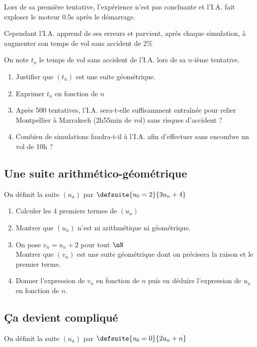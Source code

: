 \documentclass[oneside,12pt]{book}          %
\begin{document}
Lors de sa première tentative, l'expérience n'est pas concluante et l'I.A. fait exploser le moteur 0.5s après le démarrage.

Cependant l'I.A. apprend de ses erreurs et parvient, après chaque simulation, à augmenter son temps de vol sans accident de 2\%

On note $t_n$ le temps de vol sans accident de l'I.A. lors de sa $n$-ième tentative.

\begin{enumerate}
    \item Justifier que $(t_n)$ est une suite géométrique.
    \item Exprimer $t_n$ en fonction de $n$
    \item Après 500 tentatives, l'I.A. sera-t-elle suffisamment entraînée pour relier Montpellier à Marrakech (2h55min de vol) sans risques d'accident ?
    \item[\faCalculator] Combien de simulations faudra-t-il à l'I.A. afin d'effectuer sans encombre un vol de 10h ? 
\end{enumerate}



\subsection{Une suite arithmético-géométrique}
On définit la suite $(u_n)$ par $\defsuite{u_{0}=2}{3u_n+4}$
\begin{enumerate}
    \item Calculer les 4 premiers termes de $(u_n)$
    \item Montrer que $(u_n)$ n'est ni arithmétique ni géométrique.
    \item On pose $v_{n}=u_n+2$ pour tout $\nN$ \\
    Montrer que $(v_{n})$ est une suite géométrique dont on précisera la raison et le premier terme.
    \item Donner l'expression de $v_{n}$ en fonction de $n$ puis en déduire l'expression de $u_n$ en fonction de $n$.
\end{enumerate}



\subsection{Ça devient compliqué}
On définit la suite $(u_n)$ par $\defsuite{u_0=0}{2u_n+n}$
\end{document}
